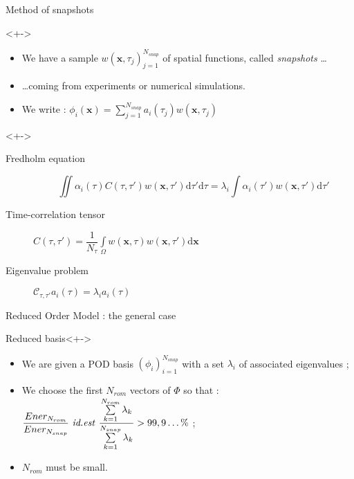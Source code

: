 \begin{frame}{Method of snapshots}
%
\begin{block}{}<+->
\begin{itemize}
\item<+-> We have a sample $w(\mathbf{x},\tau_j)_{j=1}^{N_{snap}}$ of spatial functions, called \emph{snapshots} \dots
\item<+-> \dots coming from experiments or numerical simulations.
\item<+-> We write : %
$\phi_i(\mathbf{x})=\sum\limits_{j=1}^{N_{snap}}a_i(\tau_j) w(\mathbf{x},\tau_j)$
\end{itemize}
\end{block}
%
\begin{block}{}<+->%
\begin{description}
\item %
[Fredholm equation]
\[%
\iint\alpha_i(\tau)C(\tau,\tau')w(\mathbf{x},\tau ')\text{d}\tau'\text{d}\tau%
=\lambda_i\int\alpha_i(\tau')w(\mathbf{x},\tau')\text{d}\tau'%
\]
\item %
[Time-correlation tensor] $C(\tau,\tau ')=\dfrac{1}{N_{\tau}}\int\limits_{\Omega} w(\mathbf{x},\tau)w(\mathbf{x},\tau')\text{d}\mathbf{x}$
\item %
[Eigenvalue problem] %
$\mathcal{C}_{\tau,\tau'}a_i(\tau)=\lambda_i a_i(\tau)$
\end{description}
\end{block}
%
\end{frame}

\begin{frame}{Reduced Order Model : the general case}
%
\begin{block}{Reduced basis}<+->
\begin{itemize}
\item<+-> We are given a POD basis $(\phi_i)_{i=1}^{N_{snap}}$ with a set $\lambda_i$ of associated eigenvalues ;
\item<+-> We choose the first $N_{rom}$ vectors of $\Phi$ so that : %
$\dfrac{Ener_{N_{rom}}}{Ener_{N_{snap}}}\text{ \textit{id.est} }\dfrac{\sum\limits_{k=1}^{N_{rom}}\lambda_k}{\sum\limits_{k=1}^{N_{snap}}\lambda_k} >99,9\dots \%$ ;
\item<+-> $N_{rom}$ must be small.
\end{itemize}
\end{block}
%
\end{frame}

